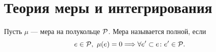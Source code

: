 \chapter{Теория меры и интегрирования}
\begin{defn}
    Пусть $ \mu $ --- мера на полукольце $ \P$. Мера называется {\sf полной}, если
	\[
		e \in \P, ~ \mu(e) = 0 \Longrightarrow \forall e' \subset e \colon e' \in \P
	.\] 
\end{defn}
